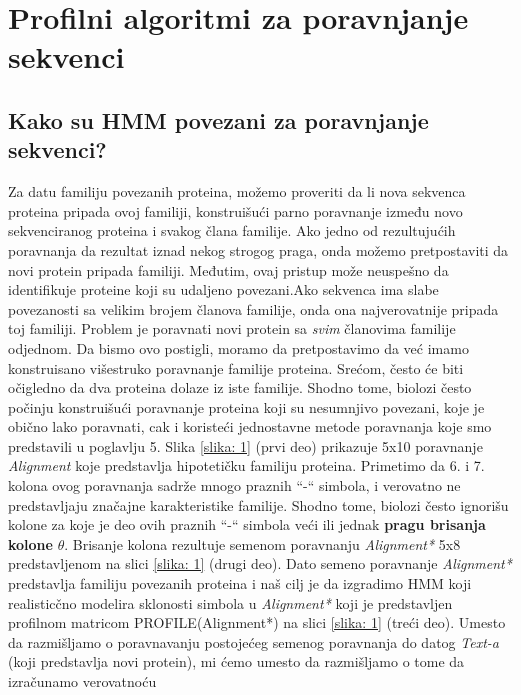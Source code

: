\section{Profilni algoritmi za poravnjanje sekvenci}
\subsection{Kako su HMM povezani za poravnjanje sekvenci?}

Za datu familiju povezanih proteina, možemo proveriti da li nova sekvenca proteina pripada ovoj familiji, konstruišući parno poravnanje između novo sekvenciranog proteina i svakog člana familije. Ako jedno od rezultujućih poravnanja da rezultat iznad nekog strogog praga, onda možemo pretpostaviti da novi protein pripada familiji. Međutim, ovaj pristup može neuspešno da identifikuje proteine koji su udaljeno povezani.Ako sekvenca ima slabe povezanosti sa velikim brojem članova familije, onda ona najverovatnije pripada toj familiji.
Problem je poravnati novi protein sa \textit{svim} članovima familije odjednom. Da bismo ovo postigli, moramo da pretpostavimo da već imamo konstruisano višestruko poravnanje familije proteina. Srećom, često će biti očigledno da dva proteina dolaze iz iste familije. Shodno tome, biolozi često počinju konstruišući poravnanje proteina koji su nesumnjivo povezani, koje je obično lako poravnati, cak i koristeći jednostavne metode poravnanja koje smo predstavili u poglavlju 5.
Slika \ref{slika: 1} (prvi deo) prikazuje 5x10 poravnanje \textit{Alignment} koje predstavlja hipotetičku familiju proteina. Primetimo da 6. i 7. kolona ovog poravnanja sadrže mnogo praznih ``-`` simbola, i verovatno ne predstavljaju značajne karakteristike familije. Shodno tome, biolozi često ignorišu kolone za koje je deo ovih praznih ``-`` simbola veći ili jednak \textbf{pragu brisanja kolone} $\theta$. Brisanje kolona rezultuje semenom poravnanju \textit{Alignment*} 5x8 predstavljenom na slici \ref{slika: 1} (drugi deo).
Dato semeno poravnanje \textit{Alignment*} predstavlja familiju povezanih proteina i naš cilj je da izgradimo HMM koji realisticčno modelira sklonosti simbola u \textit{Alignment*} koji je predstavljen profilnom matricom PROFILE(Alignment*) na slici \ref{slika: 1} (treći deo). Umesto da razmišljamo o poravnavanju postojećeg  semenog poravnanja do datog \textit{Text-a} (koji predstavlja novi protein), mi ćemo umesto da razmišljamo o tome da izračunamo verovatnoću


